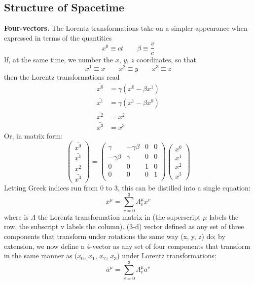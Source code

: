 \documentclass[../main.tex]{subfiles}
\begin{document}
\subsection*{Structure of Spacetime}
\textbf{Four-vectors.} The Lorentz transformations take on a simpler appearance when expressed in terms of the quantities
\begin{equation*}
    x^0\equiv ct\qquad \beta\equiv \frac{v}{c}
\end{equation*}
If, at the same time, we number the $x$, $y$, $z$ coordinates, so that
\begin{equation*}
    x^1\equiv x\qquad x^2\equiv y\qquad x^3\equiv z
\end{equation*}
then the Lorentz transformations read
\begin{align*}
    \bar{x^0} &= \gamma (x^0 - \beta x^1)\\
    \bar{x^1} &= \gamma(x^1-\beta x^0)\\
    \bar{x^2} &= x^2\\
    \bar{x^3}&=x^3
\end{align*}
Or, in matrix form:
\begin{equation*}
    \begin{pmatrix}
        \bar{x^0}\\
        \bar{x^1}\\
        \bar{x^2}\\
        \bar{x^3}
    \end{pmatrix}=
    \begin{pmatrix}
        \gamma&-\gamma\beta&0&0\\
        -\gamma\beta&\gamma&0&0\\
        0&0&1&0\\
        0&0&0&1\\
    \end{pmatrix}
    \begin{pmatrix}
        {x^0}\\
        {x^1}\\
        {x^2}\\
        {x^3}
    \end{pmatrix}
\end{equation*}
Letting Greek indices run from 0 to 3, this can be distilled into a single equation:
\begin{equation*}
\bar{x}^{\mu}=\sum_{v=0}^{3}\Lambda_{v}^{\mu}x^v
\end{equation*}
where is $\Lambda$ the Lorentz transformation matrix in (the superscript $\mu$ labels the row, the subscript v labels the column). (3-d) vector defined as any set of three components that transform under rotations the same way (x, y, z) do; by extension, we now define a 4-vector as any set of four components that transform in the same manner as ($x_0$, $x_1$, $x_2$, $x_3$) under Lorentz transformations:
\begin{equation*}
\bar{a}^{\mu}=\sum_{v=0}^{3}\Lambda_{v}^{\mu}a^v
\end{equation*}
\end{document}

